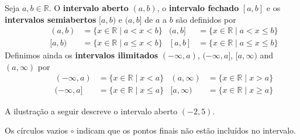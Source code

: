 \begin{definition}
\label{defIntervals}
\nindex{abint3}{$(a,b]$}{half-open interval}
\nindex{abint4}{$[a,b)$}{half-open interval}
Seja $a,b \in \mathbb{R}$. O \textbf{intervalo aberto} $(a,b)$, o \textbf{intervalo fechado} $[a,b]$ e os \textbf{intervalos semiabertos} $[a,b)$ e $( a,b]$ de $a$ a $b$ são definidos por
\begin{align*}
\hspace{35pt} (a,b) &= \{ x \in \mathbb{R} \mid a < x < b \}
&
(a,b] &= \{ x \in \mathbb{R} \mid a < x \le b \} 
\\
\hspace{35pt} [a,b) &= \{ x \in \mathbb{R} \mid a \le x < b \}
&
[a,b] &= \{ x \in \mathbb{R} \mid a \le x \le b \}
\end{align*}
Definimos ainda os \textbf{intervalos ilimitados} $(-\infty, a)$, $(-\infty, a]$, $[a, \infty)$ and $(a, \infty)$  por
\begin{align*}
\hspace{35pt} (-\infty,a) &= \{ x \in \mathbb{R} \mid x < a \}
&
(a,\infty) &= \{ x \in \mathbb{R} \mid x > a \}
\\
\hspace{35pt} (-\infty, a] &= \{ x \in \mathbb{R} \mid x \le a \} 
&
[a,\infty) &= \{ x \in \mathbb{R} \mid x \ge a \}
\end{align*}
\end{definition}

\begin{example}
A ilustração a seguir descreve o intervalo aberto $(-2,5)$.

\vspace{-10pt}
\begin{center}
\end{center}
Os círculos vazios $\circ$ indicam que os pontos finais não estão incluídos no intervalo.
\end{example}

